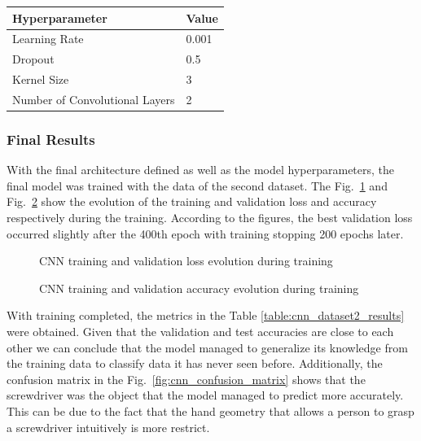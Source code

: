 \begin{table}[H]
\label{table:cnn_best_hyperparameters}
\centering
\begin{tabular}{|l|l|}
\hline
Hyperparameter & Value \\
\hline
Learning Rate & 0.001 \\
\hline
Dropout & 0.5 \\
\hline
Kernel Size & 3 \\
\hline
Number of Convolutional Layers & 2 \\
\hline
\end{tabular}
\end{table}

\subsubsection{Final Results}

With the final architecture defined as well as the model hyperparameters, the final model was trained with the data of the second dataset. The Fig.~\ref{fig:cnn_loss} and Fig.~\ref{fig:cnn_acc} show the evolution of the training and validation loss and accuracy respectively during the training. According to the figures, the best validation loss occurred slightly after the 400th epoch with training stopping 200 epochs later.

\begin{figure}[H]
\centerline{}
\caption[CNN training and validation loss evolution during training]{CNN training and validation loss evolution during training}
\label{fig:cnn_loss}
\end{figure}

\begin{figure}[H]
\centerline{}
\caption[CNN training and validation accuracy evolution during training]{CNN training and validation accuracy evolution during training}
\label{fig:cnn_acc}
\end{figure}

With training completed, the metrics in the Table \ref{table:cnn_dataset2_results} were obtained. Given that the validation and test accuracies are close to each other we can conclude that the model managed to generalize its knowledge from the training data to classify data it has never seen before. Additionally, the confusion matrix in the Fig.~\ref{fig:cnn_confusion_matrix} shows that the screwdriver was the object that the model managed to predict more accurately. This can be due to the fact that the hand geometry that allows a person to grasp a screwdriver intuitively is more restrict.

